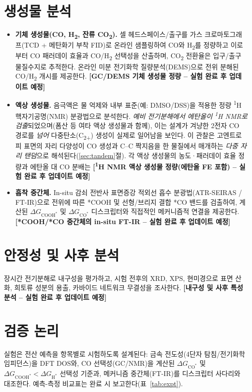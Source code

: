 \documentclass[11pt,a4paper]{report}
\newcommand{\tbu}[1]{\textcolor{red!70!black}{\textbf{[#1 -- 실험 완료 후 업데이트 예정]}}}
\newcommand{\dGCO}{\Delta G_{\mathrm{CO^*}}}
\newcommand{\dGH}{\Delta G_{\mathrm{H^*}}}
\newcommand{\dGCOOH}{\Delta G_{\mathrm{COOH^*}}}
\begin{document}
\section{생성물 분석}
\begin{itemize}[nosep]
\item \textbf{기체 생성물(CO, H\textsubscript{2}, 잔류 CO\textsubscript{2}).} 셀 헤드스페이스/출구를
가스 크로마토그래프(TCD + 메탄화기 부착 FID)로 온라인 샘플링하여 CO와 H\textsubscript{2}를 정량하고
이로부터 CO 패러데이 효율과 CO/H\textsubscript{2} 선택성을 산출하며, CO\textsubscript{2} 전환율은
입구/출구 물질수지로 추적한다. 온라인 미분 전기화학 질량분석(DEMS)으로 전위 분해된 CO/H\textsubscript{2}
개시를 제공한다. \tbu{GC/DEMS 기체 생성물 정량}
\item \textbf{액상 생성물.} 음극액은 물 억제와 내부 표준(예: DMSO/DSS)을 적용한 정량
\textsuperscript{1}H 핵자기공명(NMR) 분광법으로 분석한다. \emph{예비 전기분해에서 에탄올이
\textsuperscript{1}H NMR로 검출}되었으며(폼산 등 여타 액상 생성물과 함께), 이는 설계가 겨냥한
2전자 CO 경로를 \emph{넘어} 다중탄소(C\textsubscript{2+}) 생성이 실제로 일어남을 보인다. 이 관찰은
고엔트로피 표면의 자리 다양성이 CO 생성과 C--C 짝지음을 한 물질에서 매개하는 \emph{다중 자리
탠덤}으로 해석된다(\ref{sec:tandem}절). 각 액상 생성물의 농도·패러데이 효율 정량과 에탄올 대 CO
분배는 \tbu{\textsuperscript{1}H NMR 액상 생성물 정량(에탄올 FE 포함)}
\item \textbf{흡착 중간체.} In-situ 감쇠 전반사 표면증강 적외선 흡수 분광법(ATR-SEIRAS / FT-IR)으로
전위에 따른 *COOH 및 선형/브리지 결합 *CO 밴드를 검출하여, 계산된 $\dGCOOH$ 및 $\dGCO$ 디스크립터와
직접적인 메커니즘적 연결을 제공한다. \tbu{*COOH/*CO 중간체의 in-situ FT-IR}
\end{itemize}

\section{안정성 및 사후 분석}
장시간 전기분해로 내구성을 평가하고, 시험 전후의 XRD, XPS, 현미경으로 표면 산화, 희토류 성분의 용출,
카바이드 네트워크 무결성을 조사한다. \tbu{내구성 및 사후 특성 분석}

\section{검증 논리}
실험은 전산 예측을 항목별로 시험하도록 설계된다: 금속 전도성(4단자 탐침/전기화학 임피던스)을 DFT DOS와,
CO 선택성(GC/NMR)을 계산된 $\dGCO$ 및 $\dGCOOH<\dGH$ 선택성 기준과, 메커니즘 중간체(FT-IR)를
디스크립터 사다리와 대조한다. 예측-측정 비교표는 완료 시 보고한다(표~\ref{tab:expt}).
\end{document}
